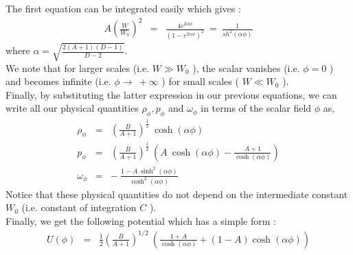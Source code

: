 \documentclass[a4paper,12pt,a4]{article}
\begin{document}
The first equation can be integrated easily which gives : 
\begin{eqnarray}
A \left( \frac{W}{W_0} \right)^2 & = & 
\frac{4 e^{2 \alpha \phi}}{\left( 1 - e^{2 \alpha \phi} \right)^2}~ = ~ 
\frac{1}{ sh^2 (\alpha \phi)} 
\end{eqnarray}
where $\alpha = \sqrt{\frac{2 (A +1) (D -1)}{D -2 }}$. \\
We note that for larger scales (i.e. $W \gg W_0$ ), 
the scalar vanishes (i.e. $\phi = 0$ ) 
and becomes infinite (i.e. $\phi \rightarrow \ + 
\infty$ ) for small scales 
( $W \ll W_0$ ). \\
Finally, by substituting the latter expression in our previous equations, 
we can write all our physical quantities $\rho_{\phi}, p_{\phi}$ and 
$\omega_{\phi}$ in terms of the scalar field $\phi$ as, 
\begin{eqnarray}
\rho_{\phi} & = & \left( \frac{B}{A + 1} \right)^{\frac{1}{2}}~
\cosh (\alpha \phi) \nonumber \\
p_{\phi} & = & \left( \frac{B}{A + 1} \right)^{\frac{1}{2}}~
\left( A~\cosh (\alpha \phi) - 
\frac{A+1}{\cosh (\alpha \phi)} \right) \nonumber \\
\omega_{\phi} & = & -~\frac{1 - A~\sinh^2 (\alpha \phi )}{\cosh^2 (\alpha \phi)}
\end{eqnarray}
Notice that these physical quantities do not depend on the intermediate 
constant $W_0$ (i.e. constant of integration $C$ ). \\
Finally, we get the following potential which has a simple form :
\begin{eqnarray}
U ( \phi) & = & \frac{1}{2} \left( \frac{B}{A + 1} \right)^{1/2}~ 
\left( \frac{1 + A}{\cosh (\alpha \phi)} + (1  - A) \cosh (\alpha \phi) \right) 
\end{eqnarray} 
\end{document}
